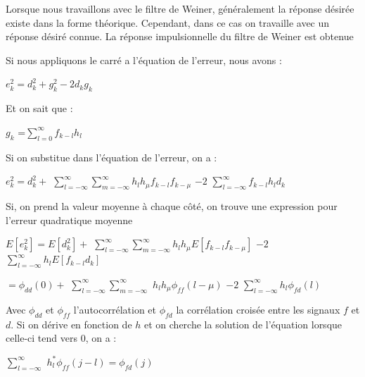 \documentclass[conference,onecolumn]{IEEEtran}
\begin{document}
Lorsque nous travaillons avec le filtre de Weiner, généralement la réponse désirée existe dans la forme théorique. Cependant, dans ce cas on travaille avec un réponse désiré connue. La réponse impulsionnelle du filtre de Weiner est obtenue 

Si nous appliquons le carré a l’équation de l’erreur, nous avons :

\begin{center}
    $e_k^2=d_k^2+g_k^2-2d_kg_k$
\end{center}{}
    

Et on sait que :

\begin{center}
     $g_k$ =$\displaystyle\sum_{l=0}^{\infty}f_{k-l} h_l $
\end{center}


Si on substitue dans l’équation de l’erreur, on a :

\begin{center}
    $e_k^2=d_k^2+$ $\displaystyle \sum_{l=-\infty}^{\infty}\displaystyle\sum_{m=-\infty}^{\infty}$$h_l h_\mu f_{k-l} f_{k-\mu}$ $- 2$  $\displaystyle\sum_{l= -\infty}^{\infty}f_{k-l} h_l d_k$
\end{center}

Si, on prend la valeur moyenne à chaque côté, on trouve une expression pour l’erreur quadratique moyenne 

\begin{center}
     $E[e_k^2]=E[d_k^2]+$ $\displaystyle \sum_{l=-\infty}^{\infty}\displaystyle\sum_{m=-\infty}^{\infty}$$h_l h_\mu E[f_{k-l} f_{k-\mu}]$ $- 2$  $\displaystyle\sum_{l= -\infty}^{\infty}h_l E[f_{k-l}  d_k]$
\end{center}
\begin{center}
        $= \phi_{dd} (0) + $ $\displaystyle \sum_{l=-\infty}^{\infty}\displaystyle\sum_{m=-\infty}^{\infty}$ $h_l h_\mu \phi_{ff} (l-\mu)$  $- 2$  $\displaystyle\sum_{l= -\infty}^{\infty} h_l \phi_{fd}(l)$
\end{center}

Avec $\phi_{dd}$ et $\phi_{ff}$ l’autocorrélation et $\phi_{fd}$ la corrélation croisée entre les signaux $f$ et $d$. Si on dérive en fonction de $h$ et on cherche la solution de l’équation lorsque celle-ci tend vers $0$, on a :

\begin{center}
     $\displaystyle\sum_{l= -\infty}^{\infty}$ $h_l^* \phi_{ff} (j-l)=\phi_{fd}(j)$
\end{center}
\end{document}
